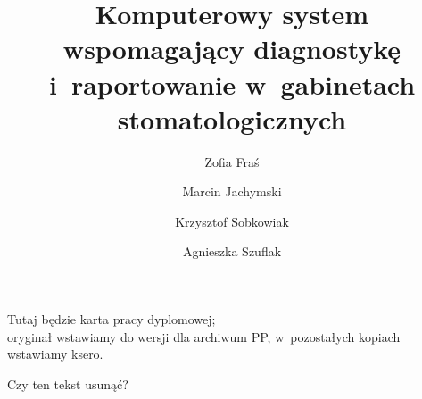 \documentclass[polish,bachelor,a4paper,oneside]{ppfcmthesis}
\author{%
   Zofia Fraś \album{136703} \and 
   Marcin Jachymski \album{136718} \and
   Krzysztof Sobkowiak \album{136799} \and
   Agnieszka Szuflak \album{136812}
   }
\title{Komputerowy system wspomagający diagnostykę i~raportowanie w~gabinetach stomatologicznych}
\begin{document}
\frontmatter\pagestyle{empty}%
\maketitle\cleardoublepage%


\thispagestyle{empty}\vspace*{\fill}%
\begin{center}Tutaj będzie karta pracy dyplomowej;\\oryginał wstawiamy do wersji dla archiwum PP, w~pozostałych kopiach wstawiamy ksero.

Czy ten tekst usunąć?
\end{center}%
\vfill\cleardoublepage%



\clearpage


\tableofcontents* 
{}
\cleardoublepage %


\listoffigures* 
{}
\cleardoublepage %


\listoftables*
{}
\cleardoublepage %

\mainmatter%








{\raggedright\sloppy\small}


%


\ppcolophon
\end{document}
